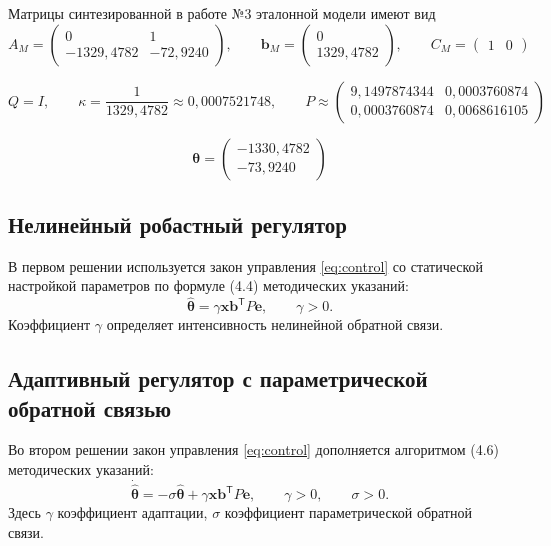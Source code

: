 Матрицы синтезированной в работе №3 эталонной модели имеют вид
\begin{equation}
  A_M=\begin{pmatrix}
    0&1\\
    -1329{,}4782&-72{,}9240
  \end{pmatrix},
  \qquad
  \bm b_M=\begin{pmatrix}
    0\\
    1329{,}4782
  \end{pmatrix},
  \qquad C_M=\begin{pmatrix}1&0\end{pmatrix}
\end{equation}

\begin{equation}
  Q=I,
  \qquad \kappa=\frac{1}{1329{,}4782}\approx0{,}0007521748,
  \qquad P\approx\begin{pmatrix}
    9{,}1497874344&0{,}0003760874\\
    0{,}0003760874&0{,}0068616105
  \end{pmatrix}
\end{equation}

\begin{equation}
  \bm\theta=
  \begin{pmatrix}
    -1330{,}4782\\
    -73{,}9240
  \end{pmatrix}
\end{equation}

\subsection{Нелинейный робастный регулятор}

В первом решении используется закон управления \eqref{eq:control}
со статической настройкой параметров по формуле (4.4) методических указаний:
\begin{equation}
  \hat{\bm\theta}=\gamma\bm x\bm b^{\mathsf T}P\bm e,
  \qquad \gamma>0.
  \label{eq:static-law}
\end{equation}
Коэффициент $\gamma$ определяет интенсивность нелинейной обратной связи.

\subsection{Адаптивный регулятор с параметрической обратной связью}

Во втором решении закон управления \eqref{eq:control} дополняется
алгоритмом (4.6) методических указаний:
\begin{equation}
  \dot{\hat{\bm\theta}}
  =-\sigma\hat{\bm\theta}+\gamma\bm x\bm b^{\mathsf T}P\bm e,
  \qquad \gamma>0,
  \qquad \sigma>0.
  \label{eq:adaptive-law}
\end{equation}
Здесь $\gamma$ \textemdash{} коэффициент адаптации,
$\sigma$ \textemdash{} коэффициент параметрической обратной связи.

